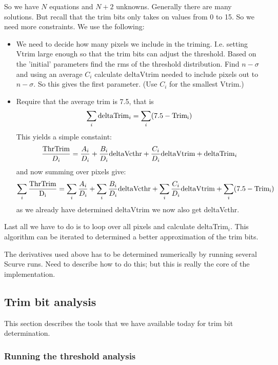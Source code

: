So we have $N$ equations and $N+2$ unknowns. Generally there are 
many solutions. But recall that the trim bits only takes on values
from 0 to 15. So we need more constraints. We use the following:

\begin{itemize}
\item We need to decide how many pixels we include in the triming.
      I.e. setting Vtrim large enough so that the trim bits can 
      adjust the threshold.
      Based on the 'initial' parameters find the rms of the threshold
      distribution. Find $n-\sigma$ and using an average $C_i$ 
      calculate deltaVtrim needed to include pixels out to $n-\sigma$.
      So this gives the first parameter. (Use $C_i$ for the smallest
      Vtrim.)


\item Require that the average trim is 7.5, that is
      $$ \sum_i {\rm deltaTrim}_i=\sum_i(7.5-{\rm Trim_i})$$
      This yields a simple constaint:
      $$
      {{\rm ThrTrim}\over D_i}={A_i \over D_i}+{B_i\over D_i}{\rm deltaVcthr}
      +{C_i\over D_i}{\rm deltaVtrim}+{\rm deltaTrim}_i
      $$
      and now summing over pixels give:
      $$\sum_i{{\rm ThrTrim \over D_i}}=
         \sum_i{A_i\over D_i}+\sum_i{B_i\over D_i}{\rm deltaVcthr}+
                     \sum_i{C_i\over D_i}{\rm deltaVtrim}+\sum_i(7.5-{\rm Trim_i})
      $$
      as we already have determined deltaVtrim we now also get 
      deltaVcthr.
\end{itemize}

Last all we have to do is to loop over all pixels and calculate deltaTrim$_i$.
This algorithm can be iterated to determined a better approximation of the trim bits.

The derivatives used above has to be determined numerically by running several Scurve runs. Need to describe how to do this; but this is really the core of the implementation.


\subsection{Trim bit analysis}

This section describes the tools that we have available today for trim bit determination.

\subsubsection{Running the threshold analysis}
\label{sect:analyzetrimrun}

